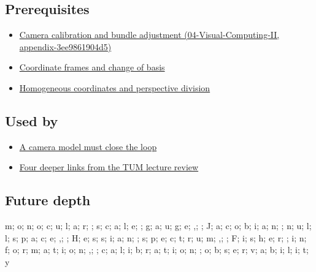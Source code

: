 \subsection{Prerequisites}\label{appendix-113f0267e5f4-prerequisites}

\begin{itemize}
\tightlist
\item
  \href{../04-Visual-Computing-II/main.pdf\#nameddest=appendix-3ee9861904d5}{Camera calibration and bundle adjustment (04-Visual-Computing-II, appendix-3ee9861904d5)}
\item
  \hyperref[appendix-1bae9457dbc3]{Coordinate frames and change of basis}
\item
  \hyperref[appendix-cb3b26862282]{Homogeneous coordinates and perspective division}
\end{itemize}

\subsection{Used by}\label{appendix-113f0267e5f4-used-by}

\begin{itemize}
\tightlist
\item
  \hyperref[02-foundations-ii-ch037-a-camera-model-must-close-the-loop]{A camera model must close the loop}
\item
  \hyperref[02-foundations-ii-ch036-four-deeper-links-from-the-tum-lecture-review]{Four deeper links from the TUM lecture review}
\end{itemize}

\subsection{Future depth}\label{appendix-113f0267e5f4-future-depth}

m; o; n; o; c; u; l; a; r; ; s; c; a; l; e; ; g; a; u; g; e; ,; ; J; a; c; o; b; i; a; n; ; n; u; l; l; s; p; a; c; e; ,; ; H; e; s; s; i; a; n; ; s; p; e; c; t; r; u; m; ,; ; F; i; s; h; e; r; ; i; n; f; o; r; m; a; t; i; o; n; ,; ; c; a; l; i; b; r; a; t; i; o; n; ; o; b; s; e; r; v; a; b; i; l; i; t; y
